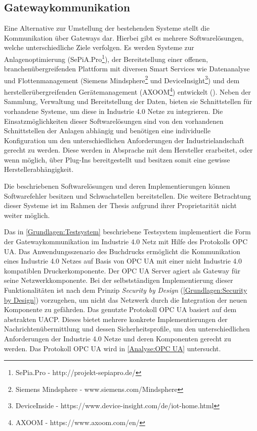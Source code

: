 \subsection{Gatewaykommunikation}
\label{Analyse:Gatewaykommunikation}
Eine Alternative zur Umstellung der bestehenden Systeme stellt die Kommunikation über Gateways dar. Hierbei gibt es mehrere Softwarelösungen, welche unterschiedliche Ziele verfolgen. Es werden Systeme zur Anlagenoptimierung (SePiA.Pro\footnote{SePia.Pro - http://projekt-sepiapro.de/}), der Bereitstellung einer offenen, branchenübergreifenden Plattform mit diversen Smart Services wie Datenanalyse und Flottenmanagement (Siemens Mindsphere\footnote{Siemens Mindsphere - www.siemens.com/Mindsphere} und DeviceInsight\footnote{DeviceInside - https://www.device-insight.com/de/iot-home.html}) und dem herstellerübergreifenden Gerätemanagement (AXOOM\footnote{AXOOM - https://www.axoom.com/en/}) entwickelt (\cite{acatec2016}). Neben der Sammlung, Verwaltung und Bereitstellung der Daten, bieten sie Schnittstellen für vorhandene Systeme, um diese in Industrie 4.0 Netze zu integrieren. Die Einsatzmöglichkeiten dieser Softwarelösungen sind von den vorhandenen Schnittstellen der Anlagen abhängig und benötigen eine individuelle Konfiguration um den unterschiedlichen Anforderungen der Industrielandschaft gerecht zu werden. Diese werden in Absprache mit dem Hersteller erarbeitet, oder wenn möglich, über Plug-Ins bereitgestellt und besitzen somit eine gewisse Herstellerabhängigkeit.

Die beschriebenen Softwarelösungen und deren Implementierungen können Softwarefehler besitzen und Schwachstellen bereitstellen. Die weitere Betrachtung dieser Systeme ist im Rahmen der Thesis aufgrund ihrer Proprietarität nicht weiter möglich.

Das in \autoref{Grundlagen:Testsystem} beschriebene Testsystem implementiert die Form der Gatewaykommunikation im Industrie 4.0 Netz mit Hilfe des Protokolls \ac{OPC UA}. Das Anwendungsszenario des Buchdrucks ermöglicht die Kommunikation eines Industrie 4.0 Netzes auf Basis von \ac{OPC UA} mit einer nicht Industrie 4.0 kompatiblen Druckerkomponente. Der \ac{OPC UA} Server agiert als Gateway für seine Netzwerkkomponente. Bei der selbstständigen Implementierung dieser Funktionalitäten ist nach dem Prinzip \textit{Security by Design} (\autoref{Grundlagen:Security by Design}) vorzugehen, um nicht das Netzwerk durch die Integration der neuen Komponente zu gefährden. Das genutzte Protokoll \ac{OPC UA} basiert auf dem abstrakten \ac{UACP}. Dieses bietet mehrere konkrete Implementierungen der Nachrichtenübermittlung und dessen Sicherheitsprofile, um den unterschiedlichen Anforderungen der Industrie 4.0 Netze und deren Komponenten gerecht zu werden. Das Protokoll \ac{OPC UA} wird in \autoref{Analyse:OPC UA} untersucht.

